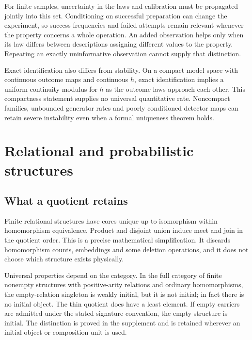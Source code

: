 For finite samples, uncertainty in the laws and calibration must be propagated jointly into this set. Conditioning on successful preparation can change the experiment, so success frequencies and failed attempts remain relevant whenever the property concerns a whole operation. An added observation helps only when its law differs between descriptions assigning different values to the property. Repeating an exactly uninformative observation cannot supply that distinction.

Exact identification also differs from stability. On a compact model space with continuous outcome maps and continuous $h$, exact identification implies a uniform continuity modulus for $h$ as the outcome laws approach each other. This compactness statement supplies no universal quantitative rate. Noncompact families, unbounded generator rates and poorly conditioned detector maps can retain severe instability even when a formal uniqueness theorem holds.

\section{Relational and probabilistic structures}
\label{col:structures}

\subsection{What a quotient retains}

Finite relational structures have cores unique up to isomorphism within homomorphism equivalence. Product and disjoint union induce meet and join in the quotient order. This is a precise mathematical simplification. It discards homomorphism counts, embeddings and some deletion operations, and it does not choose which structure exists physically.

Universal properties depend on the category. In the full category of finite nonempty structures with positive-arity relations and ordinary homomorphisms, the empty-relation singleton is weakly initial, but it is not initial; in fact there is no initial object. The thin quotient does have a least element. If empty carriers are admitted under the stated signature convention, the empty structure is initial. The distinction is proved in the supplement and is retained wherever an initial object or composition unit is used.

